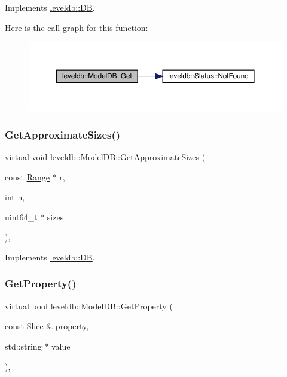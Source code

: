 Implements \mbox{\hyperlink{classleveldb_1_1_d_b_ad43bd7937b9af88ff856eb8158890911}{leveldb\+::\+DB}}.

Here is the call graph for this function\+:
\nopagebreak
\begin{figure}[H]
\begin{center}
\leavevmode
\includegraphics[width=350pt]{classleveldb_1_1_model_d_b_ab7744a74b5c0d2cd812dd87e83ca561b_cgraph}
\end{center}
\end{figure}
\mbox{\label{classleveldb_1_1_model_d_b_aeb5502077fae602c5ca3c1153f29b693}} 
\subsubsection{\texorpdfstring{GetApproximateSizes()}{GetApproximateSizes()}}
{\footnotesize\ttfamily virtual void leveldb\+::\+Model\+D\+B\+::\+Get\+Approximate\+Sizes (\begin{DoxyParamCaption}\item[{const \mbox{\hyperlink{structleveldb_1_1_range}{Range}} $\ast$}]{r,  }\item[{int}]{n,  }\item[{uint64\+\_\+t $\ast$}]{sizes }\end{DoxyParamCaption})\hspace{0.3cm}{\ttfamily [inline]}, {\ttfamily [virtual]}}



Implements \mbox{\hyperlink{classleveldb_1_1_d_b_ad4d54aa1dbcecc8583b013ab2d67aeff}{leveldb\+::\+DB}}.

\mbox{\label{classleveldb_1_1_model_d_b_a5c83a50a08e45c2564c39a650ea55b86}} 
\subsubsection{\texorpdfstring{GetProperty()}{GetProperty()}}
{\footnotesize\ttfamily virtual bool leveldb\+::\+Model\+D\+B\+::\+Get\+Property (\begin{DoxyParamCaption}\item[{const \mbox{\hyperlink{classleveldb_1_1_slice}{Slice}} \&}]{property,  }\item[{std\+::string $\ast$}]{value }\end{DoxyParamCaption})\hspace{0.3cm}{\ttfamily [inline]}, {\ttfamily [virtual]}}




